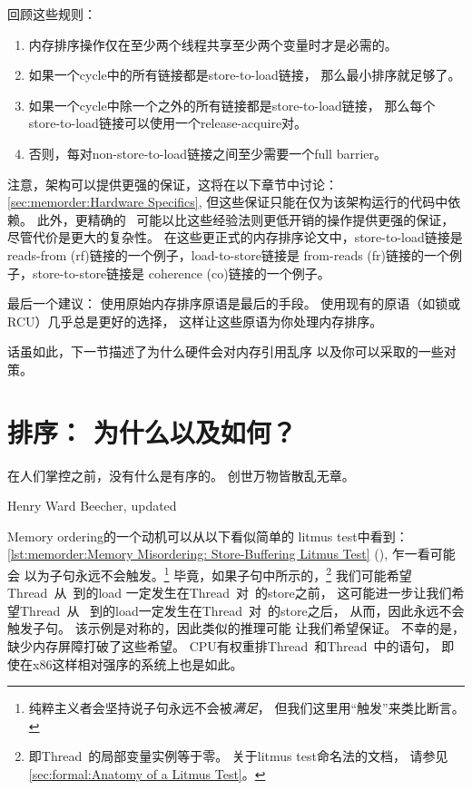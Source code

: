 回顾这些规则：

\begin{enumerate}
\item	内存排序操作仅在至少两个线程共享至少两个变量时才是必需的。
\item	如果一个cycle中的所有链接都是store-to-load链接，
	那么最小排序就足够了。
\item	如果一个cycle中除一个之外的所有链接都是store-to-load链接，
	那么每个store-to-load链接可以使用一个release-acquire对。
\item	否则，每对non-store-to-load链接之间至少需要一个full barrier。
\end{enumerate}

注意，架构可以提供更强的保证，这将在以下章节中讨论：
\cref{sec:memorder:Hardware Specifics},
但这些保证只能在仅为该架构运行的代码中依赖。
此外，更精确的~\cite{Alglave:2018:FSC:3173162.3177156}
可能以比这些经验法则更低开销的操作提供更强的保证，
尽管代价是更大的复杂性。
在这些更正式的内存排序论文中，store-to-load链接是
reads-from (rf)链接的一个例子，load-to-store链接是
from-reads (fr)链接的一个例子，store-to-store链接是
coherence (co)链接的一个例子。

最后一个建议：
使用原始内存排序原语是最后的手段。
使用现有的原语（如锁或RCU）几乎总是更好的选择，
这样让这些原语为你处理内存排序。

话虽如此，下一节描述了为什么硬件会对内存引用乱序
以及你可以采取的一些对策。

\section{排序：
		   为什么以及如何？}
\label{sec:memorder:Ordering: Why and How?}
%
\epigraph{在人们掌控之前，没有什么是有序的。
	  创世万物皆散乱无章。}
	 {Henry Ward Beecher, updated}

Memory ordering的一个动机可以从以下看似简单的
litmus test中看到：
\cref{lst:memorder:Memory Misordering: Store-Buffering Litmus Test}
(),
乍一看可能会
以为子句永远不会触发。\footnote{
	纯粹主义者会坚持说子句永远不会被\emph{满足}，
	但我们这里用``触发''来类比断言。}
毕竟，如果子句中所示的，\footnote{
	即Thread~的局部变量实例等于零。
	关于litmus test命名法的文档，
	请参见\cref{sec:formal:Anatomy of a Litmus Test}。}
我们可能希望Thread~从~到的load
一定发生在Thread~对~的store之前，
这可能进一步让我们希望Thread~从~
到的load一定发生在Thread~对~的store之后，
从而，因此永远不会触发子句。
该示例是对称的，因此类似的推理可能
让我们希望保证。
不幸的是，缺少内存屏障打破了这些希望。
CPU有权重排Thread~和Thread~中的语句，
即使在x86这样相对强序的系统上也是如此。

